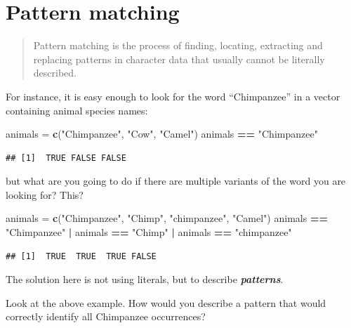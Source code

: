 \documentclass[]{book}
\newenvironment{Shaded}{\begin{snugshade}}{\end{snugshade}}
\newcommand{\KeywordTok}[1]{\textcolor[rgb]{0.13,0.29,0.53}{\textbf{#1}}}
\newcommand{\NormalTok}[1]{#1}
\newcommand{\OperatorTok}[1]{\textcolor[rgb]{0.81,0.36,0.00}{\textbf{#1}}}
\newcommand{\StringTok}[1]{\textcolor[rgb]{0.31,0.60,0.02}{#1}}
\begin{document}
\hypertarget{pattern-matching}{%
\section{Pattern matching}\label{pattern-matching}}

\begin{quote}
Pattern matching is the process of finding, locating, extracting and replacing patterns in character data that usually cannot be literally described.
\end{quote}

For instance, it is easy enough to look for the word ``Chimpanzee'' in a vector containing animal species names:

\begin{Shaded}
\begin{Highlighting}[]
\NormalTok{animals =}\StringTok{ }\KeywordTok{c}\NormalTok{(}\StringTok{"Chimpanzee"}\NormalTok{, }\StringTok{"Cow"}\NormalTok{, }\StringTok{"Camel"}\NormalTok{)}
\NormalTok{animals }\OperatorTok{==}\StringTok{ "Chimpanzee"}
\end{Highlighting}
\end{Shaded}

\begin{verbatim}
## [1]  TRUE FALSE FALSE
\end{verbatim}

but what are you going to do if there are multiple variants of the word you are looking for? This?

\begin{Shaded}
\begin{Highlighting}[]
\NormalTok{animals =}\StringTok{ }\KeywordTok{c}\NormalTok{(}\StringTok{"Chimpanzee"}\NormalTok{, }\StringTok{"Chimp"}\NormalTok{, }\StringTok{"chimpanzee"}\NormalTok{, }\StringTok{"Camel"}\NormalTok{)}
\NormalTok{animals }\OperatorTok{==}\StringTok{ "Chimpanzee"} \OperatorTok{|}\StringTok{ }\NormalTok{animals }\OperatorTok{==}\StringTok{ "Chimp"} \OperatorTok{|}\StringTok{ }\NormalTok{animals }\OperatorTok{==}\StringTok{ "chimpanzee"}
\end{Highlighting}
\end{Shaded}

\begin{verbatim}
## [1]  TRUE  TRUE  TRUE FALSE
\end{verbatim}

The solution here is not using literals, but to describe \textbf{\emph{patterns}}.

Look at the above example. How would you describe a pattern that would correctly identify all Chimpanzee occurrences?
\end{document}
